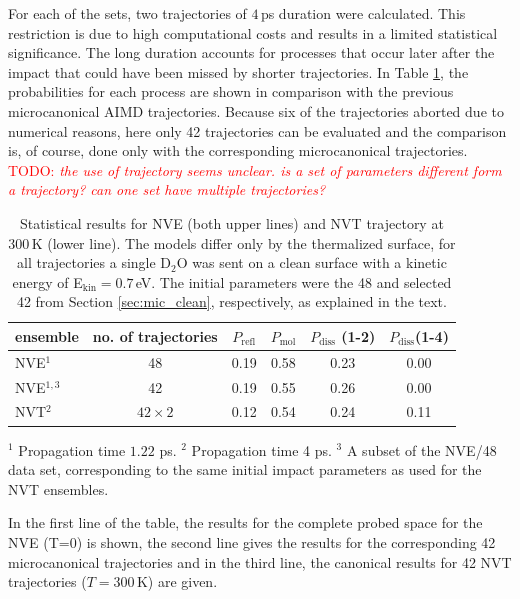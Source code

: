 \documentclass[11pt,DIV=13,BCOR=5mm,a4paper,headinclude]{scrbook}
\newcommand\todo[1]{\textcolor{red}{TODO: \textit{{#1}}}}
\begin{document}
For each of the sets, two trajectories of $4\,$ps duration were calculated.
This restriction is due to high computational costs and results in a limited statistical significance.
The long duration accounts for processes that occur later after the impact that could have been missed by shorter trajectories.
In Table \ref{tab:nvt-nve_comp}, the probabilities for each process are shown in comparison with the previous microcanonical AIMD trajectories.
Because six of the trajectories aborted due to numerical reasons, here only 42 trajectories can be evaluated and the comparison is, of course, done only with the corresponding microcanonical trajectories.
\todo{the use of trajectory seems unclear. is a set of parameters different form a trajectory? can one set have multiple trajectories?}
\begin{table}[!h]
 \centering
 \caption{Statistical results for NVE (both upper lines) and NVT trajectory at $300\,$K (lower line).
The models differ only by the thermalized surface, for all trajectories a single D$_2$O was sent on a clean surface with a kinetic energy of E$_\textrm{kin}=0.7\,$eV.
The initial parameters were the 48 and selected 42 from Section \ref{sec:mic_clean}, respectively, as explained in the text.}
\vspace*{.2cm}
  \begin{tabular}{lc|cccc}
 \toprule
  ensemble & no.
of trajectories & $P_\textrm{refl}$ & $P_\textrm{mol}$ & $P_\textrm{diss}$ (1-2) & $P_\textrm{diss}$(1-4) 
 \\\midrule
 NVE$^1$         & 48 & 0.19 & 0.58 & 0.23 & 0.00 \\
 NVE$^{1,3}$     & 42 & 0.19 & 0.55 & 0.26 & 0.00 \\
 NVT$^2$ &$42\times 2$& 0.12 & 0.54 & 0.24 & 0.11 \\\bottomrule
  \end{tabular}
\begin{tablenotes}
 \footnotesize
\item[] $^1$ Propagation time $1.22$ ps.
$^2$ Propagation time 4 ps.
$^3$ A subset of the NVE/48 data set,  corresponding to the same initial impact parameters as used for the NVT ensembles.
\end{tablenotes}
\label{tab:nvt-nve_comp}
\end{table}
In the first line of the table, the results for the complete probed space for the NVE (T=0) is shown, the second line gives the results for the corresponding 42 microcanonical trajectories and in the third line, the canonical results for 42 NVT trajectories ($T=300\,$K) are given.
\end{document}
